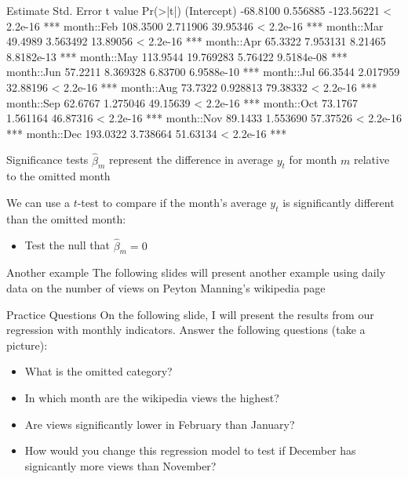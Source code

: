 \documentclass[aspectratio=169,t,11pt,table]{beamer}
\begin{document}
\begin{frame}[fragile]{}
  \begin{codeblock}
            Estimate Std. Error    t value   Pr(>|t|)    
(Intercept) -68.8100   0.556885 -123.56221  < 2.2e-16 ***
month::Feb  108.3500   2.711906   39.95346  < 2.2e-16 ***
month::Mar   49.4989   3.563492   13.89056  < 2.2e-16 ***
month::Apr   65.3322   7.953131    8.21465 8.8182e-13 ***
month::May  113.9544  19.769283    5.76422 9.5184e-08 ***
month::Jun   57.2211   8.369328    6.83700 6.9588e-10 ***
month::Jul   66.3544   2.017959   32.88196  < 2.2e-16 ***
month::Aug   73.7322   0.928813   79.38332  < 2.2e-16 ***
month::Sep   62.6767   1.275046   49.15639  < 2.2e-16 ***
month::Oct   73.1767   1.561164   46.87316  < 2.2e-16 ***
month::Nov   89.1433   1.553690   57.37526  < 2.2e-16 ***
month::Dec  193.0322   3.738664   51.63134  < 2.2e-16 ***
  \end{codeblock}
\end{frame}


\begin{frame}{Significance tests}
  $\hat{\beta}_m$ represent the difference in average $y_t$ for month $m$ relative to the omitted month 

  \bigskip
  We can use a $t$-test to compare if the month's average $y_t$ is significantly different than the omitted month:
  \begin{itemize}
    \item Test the null that $\hat{\beta}_m = 0$
  \end{itemize}
\end{frame}

\begin{frame}{Another example}
  The following slides will present another example using daily data on the number of views on Peyton Manning's wikipedia page
\end{frame}


\begin{frame}{Practice Questions}
  On the following slide, I will present the results from our regression with monthly indicators. Answer the following questions (take a picture):
  \begin{itemize}
    \item What is the omitted category?
    
    \item In which month are the wikipedia views the highest?
    
    \item Are views significantly lower in February than January?
    
    \item How would you change this regression model to test if December has signicantly more views than November?
  \end{itemize}
\end{frame}
\end{document}
